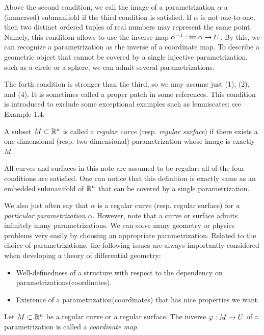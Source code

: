\documentclass{../exp}
\def\a{\alpha}
\begin{document}
Above the second condition, we call the image of a parametrization $\a$ a (immersed) submanifold if the third condition is satisfied.
If $\a$ is not one-to-one, then two distinct ordered tuples of real numbers may represent the same point.
Namely, this condition allows to use the inverse map $\a^{-1}:\im\a\to U$.
By this, we can recognize a parametrization as the inverse of a coordinate map.
To describe a geometric object that cannot be covered by a single injective parametrization, such as a circle or a sphere, we can admit several parametrizations.

The forth condition is stronger than the third, so we may assume just (1), (2), and (4).
It is sometimes called a proper patch in some references.
This condition is introduced to exclude some exceptional examples such as lemniscates: see Example 1.4.

\begin{defn}
A subset $M\subset\mathbb{R}^n$ is called a \emph{regular curve} (resp. \emph{regular surface}) if there exists a one-dimensional (resp. two-dimensional) parametrization whose image is exactly $M$.
\end{defn}

All curves and surfaces in this note are assumed to be regular: all of the four conditions are satisfied.
One can notice that this definition is exactly same as an embedded submanifold of $\mathbb{R}^n$ that can be covered by a single parametrization.

We also just often say that $\a$ is a regular curve (resp. regular surface) for \emph{a particular parametrization $\a$}.
However, note that a curve or surface admits infinitely many parametrizations.
We can solve many geometry or physics problems very easily by choosing an appropriate parametrization.
Related to the choice of parametrizations, the following issues are always importantly considered when developing a theory of differential geometry:
\begin{itemize}
\item Well-definedness of a structure with respect to the dependency on parametrizations(coordinates).
\item Existence of a parametrization(coordinates) that has nice properties we want.
\end{itemize}

\begin{defn}
Let $M\subset\mathbb{R}^n$ be a regular curve or a regular surface.
The inverse $\f:M\to U$ of a parametrization is called a \emph{coordinate map}.
\end{defn}
\end{document}
